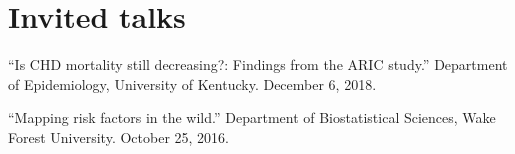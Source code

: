 \documentclass[10pt,letterpaper]{article}
\renewenvironment{itemize}{
  \begin{list}{}{
    \setlength{\leftmargin}{1.5em}
    \setlength{\itemsep}{0.25em}
    \setlength{\parskip}{0pt}
    \setlength{\parsep}{0.25em}
  }
}{
  \end{list}
}
\begin{document}

\section*{Invited talks}
\begin{itemize}
    \item ``Is CHD mortality still decreasing?: Findings from the ARIC study.'' Department of Epidemiology, University of Kentucky. December 6, 2018.
    \item ``Mapping risk factors in the wild.'' Department of Biostatistical Sciences, Wake Forest University. October 25, 2016.
\end{itemize}
\end{document}
